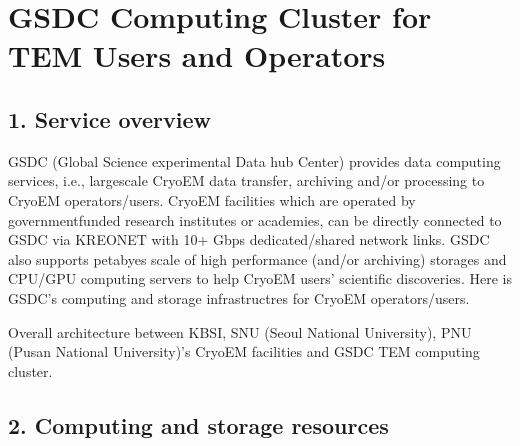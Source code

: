 \documentclass[a4paper,11pt,english]{sphinxmanual}
\begin{document}
\chapter{GSDC Computing Cluster for TEM Users and Operators}
\label{\detokenize{newfarm:gsdc-computing-cluster-for-tem-users-and-operators}}\label{\detokenize{newfarm::doc}}

\section{1. Service overview}
\label{\detokenize{newfarm:service-overview}}\label{\detokenize{newfarm:id1}}
\sphinxAtStartPar
GSDC (Global Science experimental Data hub Center) provides data computing services, i.e., large\sphinxhyphen{}scale Cryo\sphinxhyphen{}EM data transfer, archiving and/or processing to Cryo\sphinxhyphen{}EM operators/users.
Cryo\sphinxhyphen{}EM facilities which are operated by government\sphinxhyphen{}funded research institutes or academies, can be directly connected to GSDC via KREONET with 10+ Gbps dedicated/shared network links.
GSDC also supports petabyes scale of high performance (and/or archiving) storages and CPU/GPU computing servers to help Cryo\sphinxhyphen{}EM users’ scientific discoveries.
Here is GSDC’s computing and storage infrastructres for Cryo\sphinxhyphen{}EM operators/users.

\sphinxAtStartPar
Overall architecture between KBSI, SNU (Seoul National University), PNU (Pusan National University)’s Cryo\sphinxhyphen{}EM facilities and GSDC TEM computing cluster.



\section{2. Computing and storage resources}
\label{\detokenize{newfarm:computing-and-storage-resources}}\label{\detokenize{newfarm:hardware-specification-of-tem-service-farm}}
\end{document}
